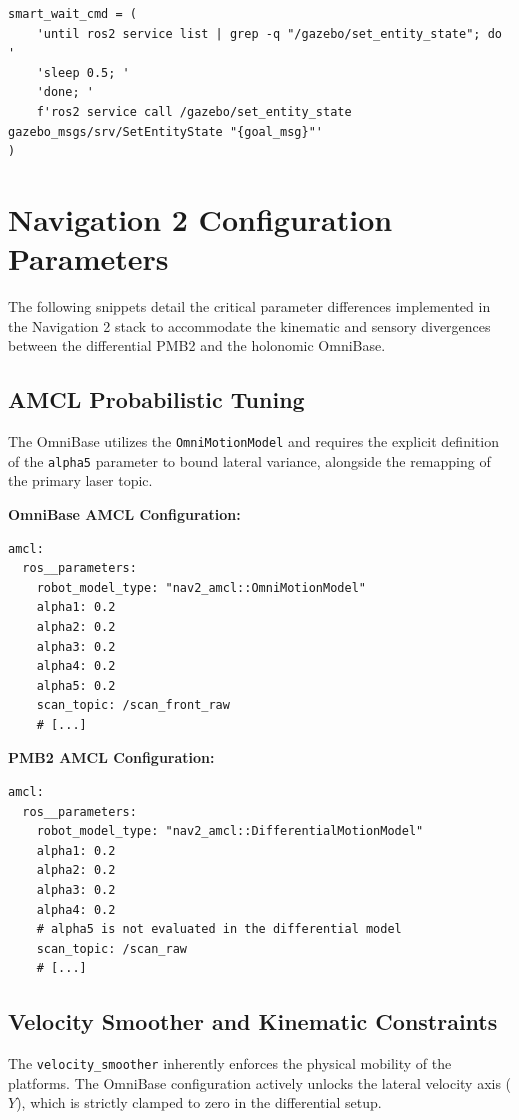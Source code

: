 \begin{lstlisting}[style=mybash]
smart_wait_cmd = (
    'until ros2 service list | grep -q "/gazebo/set_entity_state"; do '
    'sleep 0.5; '
    'done; '
    f'ros2 service call /gazebo/set_entity_state gazebo_msgs/srv/SetEntityState "{goal_msg}"'
)
\end{lstlisting}

\section{Navigation 2 Configuration Parameters}
\label{app:nav2_params}

The following snippets detail the critical parameter differences implemented in the Navigation 2 stack to accommodate the kinematic and sensory divergences between the differential PMB2 and the holonomic OmniBase.

\subsection{AMCL Probabilistic Tuning}
The OmniBase utilizes the \texttt{OmniMotionModel} and requires the explicit definition of the \texttt{alpha5} parameter to bound lateral variance, alongside the remapping of the primary laser topic.
\vspace{0.3cm}

\textbf{OmniBase AMCL Configuration:}
\begin{lstlisting}[style=myyaml]
amcl:
  ros__parameters:
    robot_model_type: "nav2_amcl::OmniMotionModel"
    alpha1: 0.2
    alpha2: 0.2
    alpha3: 0.2
    alpha4: 0.2
    alpha5: 0.2
    scan_topic: /scan_front_raw
    # [...]
\end{lstlisting}

\clearpage
\textbf{PMB2 AMCL Configuration:}
\begin{lstlisting}[style=myyaml]
amcl:
  ros__parameters:
    robot_model_type: "nav2_amcl::DifferentialMotionModel"
    alpha1: 0.2
    alpha2: 0.2
    alpha3: 0.2
    alpha4: 0.2
    # alpha5 is not evaluated in the differential model
    scan_topic: /scan_raw
    # [...]
\end{lstlisting}

\subsection{Velocity Smoother and Kinematic Constraints}
The \texttt{velocity\_smoother} inherently enforces the physical mobility of the platforms. The OmniBase configuration actively unlocks the lateral velocity axis ($Y$), which is strictly clamped to zero in the differential setup.
\vspace{0.3cm}


